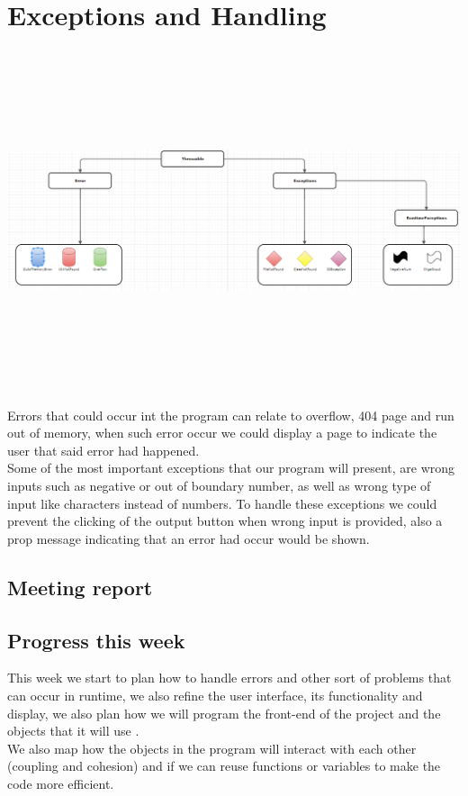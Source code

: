 \documentclass[a4paper]{article}
\begin{document}
\section{Exceptions and Handling}
\graphicspath{ {files/Exceptions.png} }
\includegraphics[width = 15cm, height=10cm]{Exceptions}

\noindent Errors that could occur int the program can relate to overflow, 404 page and run out of memory, when such error occur we could display a page to indicate the user that said error had happened.\\

\noindent Some of the most important exceptions that our program will present, are wrong inputs such as negative or out of boundary number, as well as wrong type of input like characters instead of numbers. To handle these exceptions we could prevent the clicking of the output button when wrong input is provided, also a prop message indicating that an error had occur would be shown.\\

\subsection{Meeting report}

\subsection{Progress this week}
This week we start to plan how to handle errors and other sort of problems that can occur in runtime, we also refine the user interface, its functionality and  display, we also plan how we will program the front-end of the project and the objects that it will use .\\
We also map how the objects in the program will interact with each other (coupling and cohesion) and if we can reuse functions or variables to make the code more efficient.
\end{document}
